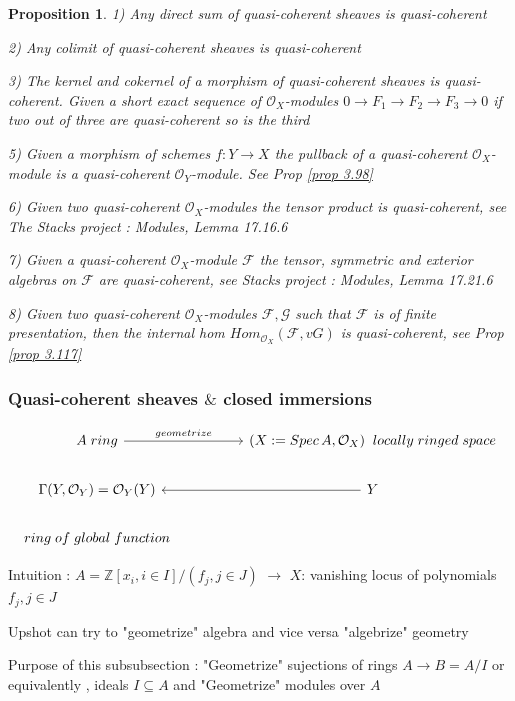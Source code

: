 \documentclass{article}
\newtheorem{proposition}[theorem]{Proposition}
\begin{document}
\begin{proposition}
1) Any direct sum of quasi-coherent sheaves is quasi-coherent

2) Any colimit of quasi-coherent sheaves is quasi-coherent

3) The kernel and cokernel of a morphism of quasi-coherent sheaves is quasi-coherent.
Given a short exact sequence of $\mathcal O_X$-modules $0 \to F_1 \to F_2 \to F_3 \to 0$ if two out of three are quasi-coherent so is the third

5) Given a morphism of schemes $f:Y \to X$ the pullback of a quasi-coherent $\mathcal O_X$-module is a quasi-coherent $\mathcal O_Y$-module. See Prop \ref{prop 3.98}

6) Given two quasi-coherent $\mathcal O_X$-modules the tensor product is quasi-coherent, see The Stacks project : Modules, Lemma 17.16.6

7) Given a quasi-coherent $\mathcal O_X$-module $\mathcal F$ the tensor, symmetric and exterior algebras on $\mathcal F$ are quasi-coherent, see Stacks project : Modules, Lemma 17.21.6

8) Given two quasi-coherent $\mathcal O_X$-modules $\mathcal F, \mathcal G$ such that $\mathcal F$ is of finite presentation, then the internal hom $Hom_{\mathcal O_X}(\mathcal F,v G)$ is quasi-coherent, see Prop \ref{prop 3.117}
\label{prop 3.61}
\end{proposition}




\subsubsection{Quasi-coherent sheaves $\&$ closed immersions}

\[\begin{tikzcd}
	{A\; ring} && {(X: = Spec\,A ,\mathcal O_X)\;\;locally\; ringed\; space} \\
	{\Gamma(Y,\mathcal O_Y)=\mathcal O_Y(Y)} && Y \\
	{ring\; of\; global\; function}
	\arrow["geometrize", from=1-1, to=1-3]
	\arrow[from=2-3, to=2-1]
\end{tikzcd}\]

Intuition : $A =\mathbb Z[x_i,i\in I]/(f_j,j\in J)$ $\to$ $X$:
vanishing locus
of polynomials
$f_j,j\in J$

Upshot can try to "geometrize" algebra
and vice versa "algebrize" geometry

Purpose of this subsubsection : "Geometrize" sujections of rings $A\to B =A/I$
or equivalently , ideals $I\subseteq A$
and "Geometrize" modules over $A$
\end{document}
